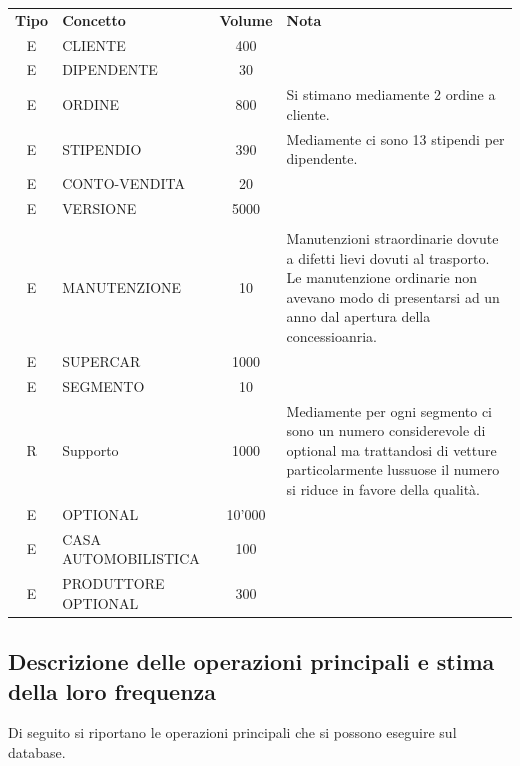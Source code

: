 \documentclass[11pt]{article}
\begin{document}
\begin{table}[htbp]
    \centering
    \small
    \begin{tabularx}{\textwidth}{c l c X }
        \rowcolor{red!20!}
        \textbf{Tipo} & \textbf{Concetto} & \textbf{Volume} & \textbf{Nota}\\
        E & CLIENTE & 400 & \\
        E & DIPENDENTE & 30 & \\
        E & ORDINE & 800 & Si stimano mediamente 2 ordine a cliente. \\
        E & STIPENDIO & 390 & Mediamente ci sono 13 stipendi per dipendente. \\
        E & CONTO-VENDITA & 20 & \\
        E & VERSIONE & 5000 & \\
        \\
        E & MANUTENZIONE & 10 & Manutenzioni straordinarie dovute a difetti
                                lievi dovuti al trasporto. Le manutenzione
                                ordinarie non avevano modo di presentarsi ad un
                                anno dal apertura della concessioanria. \\
        E & SUPERCAR & 1000 & \\
        E & SEGMENTO & 10 & \\
        R & Supporto & 1000 & Mediamente per ogni segmento ci sono un numero
                                considerevole di optional ma trattandosi di
                                vetture particolarmente lussuose il numero si
                                riduce in favore della qualità. \\
        E & OPTIONAL & 10'000 & \\
        E & CASA AUTOMOBILISTICA & 100 & \\
        E & PRODUTTORE OPTIONAL & 300 & \\  
        
    \end{tabularx}
    \label{tab:volume_table}
\end{table}

\newpage

\subsection{Descrizione delle operazioni principali e stima della loro frequenza}

Di seguito si riportano le operazioni principali che si possono eseguire sul database.
\end{document}
